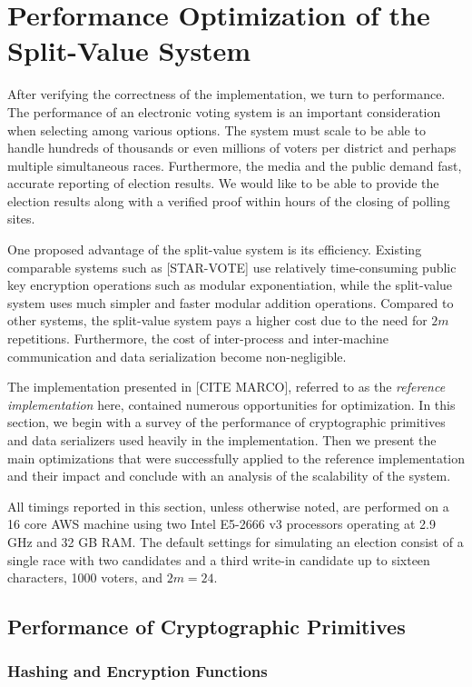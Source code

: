 \chapter{Performance Optimization of the Split-Value System}

After verifying the correctness of the implementation, we turn to performance. The performance of an electronic voting system is an important consideration when selecting among various options. The system must scale to be able to handle hundreds of thousands or even millions of voters per district and perhaps multiple simultaneous races. Furthermore, the media and the public demand fast, accurate reporting of election results. We would like to be able to provide the election results along with a verified proof within hours of the closing of polling sites.

One proposed advantage of the split-value system is its efficiency. Existing comparable systems such as [STAR-VOTE] use relatively time-consuming public key encryption operations such as modular exponentiation, while the split-value system uses much simpler and faster modular addition operations. Compared to other systems, the split-value system pays a higher cost due to the need for $2m$ repetitions. Furthermore, the cost of inter-process and inter-machine communication and data serialization become non-negligible.

The implementation presented in [CITE MARCO], referred to as the \emph{reference implementation} here, contained numerous opportunities for optimization. In this section, we begin with a survey of the performance of cryptographic primitives and data serializers used heavily in the implementation. Then we present the main optimizations that were successfully applied to the reference implementation and their impact and conclude with an analysis of the scalability of the system.

All timings reported in this section, unless otherwise noted, are performed on a 16 core AWS machine using two Intel E5-2666 v3 processors operating at 2.9 GHz and 32 GB RAM. The default settings for simulating an election consist of a single race with two candidates and a third write-in candidate up to sixteen characters, 1000 voters, and $2m = 24$.

\section{Performance of Cryptographic Primitives}

\subsection{Hashing and Encryption Functions}

